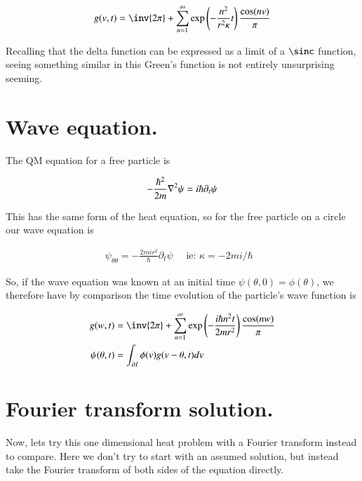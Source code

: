 \begin{align*}
g( v , t ) &= \inv{2 \pi} + \sum_{n=1}^\infty \exp\left(- \frac{n^2}{ r^2 \kappa } t \right) \frac{\cos(n v )}{\pi} \\
\end{align*}

Recalling that the delta function can be expressed as a limit of a $\sinc$ function, seeing something similar in this Green's function is not entirely unsurprising seeming.

\section{Wave equation. }

The QM equation for a free particle is

\begin{align}\label{eqn:heat_fourier:schro}
-\frac{\hbar^2}{2m} \nabla^2 \psi = i \hbar \partial_t \psi
\end{align}

This has the same form of the heat equation, so for the free particle on a circle our wave equation is

\begin{align*}
\psi_{\theta\theta} = - \frac{2 m i r^2 }{\hbar} \partial_t \psi \quad \mbox{ ie: $\kappa = - 2 m i /\hbar$ }
\end{align*}

So, if the wave equation was known at an initial time $\psi(\theta, 0) = \phi(\theta)$, we therefore have by comparison the time evolution of the particle's wave function is

\begin{align*}
g( w, t ) &= \inv{2 \pi} + \sum_{n=1}^\infty \exp\left(- \frac{i \hbar n^2 t}{ 2 m r^2 } \right) \frac{\cos(n w )}{\pi} \\
\psi(\theta, t) &= \int_{\partial I} \phi(v) g(v - \theta, t) dv 
\end{align*}


\section{Fourier transform solution. }

Now, lets try this one dimensional heat problem with a Fourier transform instead to compare.  Here we don't try to start with an
assumed solution, but instead take the Fourier transform of both sides of the equation directly.

